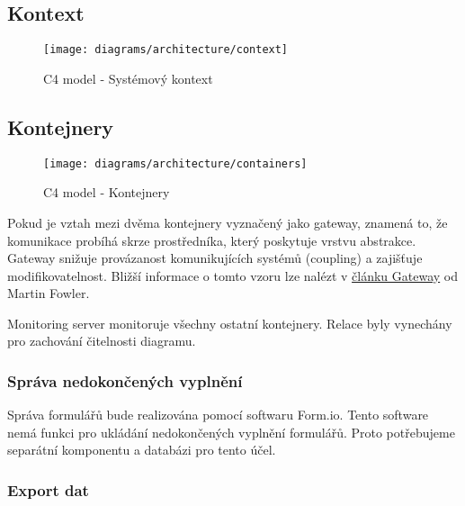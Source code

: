 \subsection{Kontext}\label{subsec:kontext}

\begin{figure}[H]
    \texttt{[image: diagrams/architecture/context]}
    \caption{C4 model - Systémový kontext}\label{fig:architecture-context}
\end{figure}

\subsection{Kontejnery}\label{subsec:kontejnery}

\begin{figure}[H]
    \texttt{[image: diagrams/architecture/containers]}
    \caption{C4 model - Kontejnery}\label{fig:architecture-containers}
\end{figure}

\begin{tcolorbox}
    Pokud je vztah mezi dvěma kontejnery vyznačený jako gateway, znamená to, že komunikace probíhá skrze prostředníka, který poskytuje vrstvu abstrakce.
    Gateway snižuje provázanost komunikujících systémů (coupling) a zajišťuje modifikovatelnost.
    Bližší informace o tomto vzoru lze nalézt v \href{https://martinfowler.com/articles/gateway-pattern.html}{článku Gateway} od Martin Fowler.
\end{tcolorbox}

\begin{tcolorbox}
    Monitoring server monitoruje všechny ostatní kontejnery.
    Relace byly vynechány pro zachování čitelnosti diagramu.
\end{tcolorbox}

\subsubsection{Správa nedokončených vyplnění}\label{subsubsec:sprava-nedokoncenych-vyplneni}

Správa formulářů bude realizována pomocí softwaru Form.io.
Tento software nemá funkci pro ukládání nedokončených vyplnění formulářů.
Proto potřebujeme separátní komponentu a databázi pro tento účel.

\subsubsection{Export dat}\label{subsubsec:export-dat}

